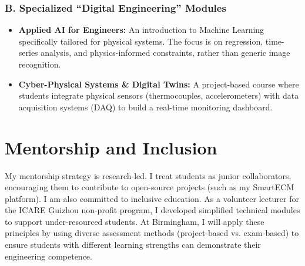 \documentclass[10pt, a4paper]{article}
\begin{document}
\subsubsection*{B. Specialized ``Digital Engineering'' Modules}
\begin{itemize}[leftmargin=*]
    \item \textbf{Applied AI for Engineers:} An introduction to Machine Learning specifically tailored for physical systems. The focus is on regression, time-series analysis, and physics-informed constraints, rather than generic image recognition.
    \item \textbf{Cyber-Physical Systems \& Digital Twins:} A project-based course where students integrate physical sensors (thermocouples, accelerometers) with data acquisition systems (DAQ) to build a real-time monitoring dashboard.
\end{itemize}

\section*{Mentorship and Inclusion}
My mentorship strategy is research-led. I treat students as junior collaborators, encouraging them to contribute to open-source projects (such as my SmartECM platform). I am also committed to inclusive education. As a volunteer lecturer for the ICARE Guizhou non-profit program, I developed simplified technical modules to support under-resourced students. At Birmingham, I will apply these principles by using diverse assessment methods (project-based vs. exam-based) to ensure students with different learning strengths can demonstrate their engineering competence.
\end{document}
